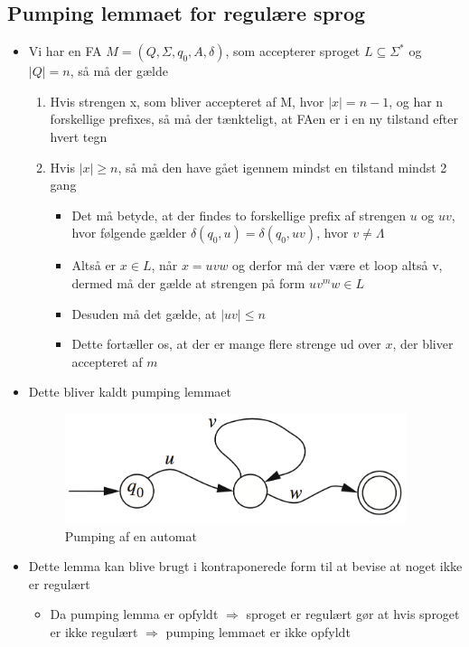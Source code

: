 \documentclass[a4, danish]{article}
\begin{document}
\subsection{Pumping lemmaet for regulære sprog}
\begin{itemize}
  \item Vi har en FA $M=(Q,\Sigma, q_0, A, \delta)$, som accepterer sproget $L \subseteq \Sigma^*$ og $|Q|=n$, så må der gælde
  \begin{enumerate}
  	\item Hvis strengen x, som bliver accepteret af M, hvor $|x|=n-1$, og har n forskellige prefixes, så må der tænkteligt, at FAen er i en ny tilstand efter hvert tegn
    \item Hvis $|x| \geq n$, så må den have gået igennem mindst en tilstand mindst 2 gang
    \begin{itemize}
	    \item Det må betyde, at der findes to forskellige prefix af strengen $u$ og $uv$, hvor følgende gælder $\delta(q_0,u)=\delta(q_0,uv)$, hvor $v \neq \Lambda$
      \item Altså er $x \in L$, når $x=uvw$ og derfor må der være et loop altså v, dermed må der gælde at strengen på form $uv^mw \in L$ 
      \item Desuden må det gælde, at $|uv| \leq n$
      \item Dette fortæller os, at der er mange flere strenge ud over $x$, der bliver accepteret af $m$
    \end{itemize}
  \end{enumerate}
  \item Dette bliver kaldt pumping lemmaet 
  \begin{figure}[h]
	  \centering
	  \includegraphics[width=100mm]{img/pumpingReg}
	  \caption{Pumping af en automat	\label{pumping1}}
  \end{figure}
  \item Dette lemma kan blive brugt i kontraponerede form til at bevise at noget ikke er regulært 
  \begin{itemize}
	  \item Da pumping lemma er opfyldt $\Rightarrow$ sproget er regulært gør at hvis sproget er ikke regulært $\Rightarrow$ pumping lemmaet er ikke opfyldt

\end{itemize}
\end{itemize}
\end{document}
